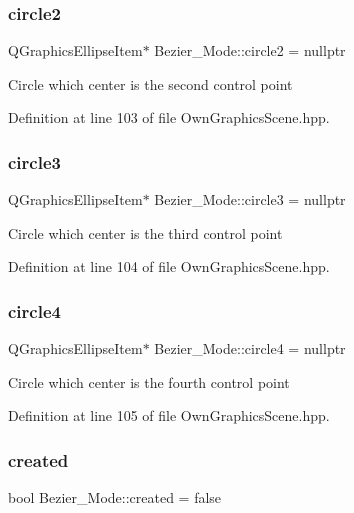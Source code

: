 \subsubsection{\texorpdfstring{circle2}{circle2}}
{\footnotesize\ttfamily Q\+Graphics\+Ellipse\+Item$\ast$ Bezier\+\_\+\+Mode\+::circle2 = nullptr}

Circle which center is the second control point 

Definition at line 103 of file Own\+Graphics\+Scene.\+hpp.

\mbox{\label{structBezier__Mode_a342d3b970c6049b615ef356a902c0781}} 
\subsubsection{\texorpdfstring{circle3}{circle3}}
{\footnotesize\ttfamily Q\+Graphics\+Ellipse\+Item$\ast$ Bezier\+\_\+\+Mode\+::circle3 = nullptr}

Circle which center is the third control point 

Definition at line 104 of file Own\+Graphics\+Scene.\+hpp.

\mbox{\label{structBezier__Mode_a6f26e1fe7da425063b792dab9f3c1099}} 
\subsubsection{\texorpdfstring{circle4}{circle4}}
{\footnotesize\ttfamily Q\+Graphics\+Ellipse\+Item$\ast$ Bezier\+\_\+\+Mode\+::circle4 = nullptr}

Circle which center is the fourth control point 

Definition at line 105 of file Own\+Graphics\+Scene.\+hpp.

\mbox{\label{structBezier__Mode_ae2573f8601e7d9f439d2bfbc11c34ae9}} 
\subsubsection{\texorpdfstring{created}{created}}
{\footnotesize\ttfamily bool Bezier\+\_\+\+Mode\+::created = false}

